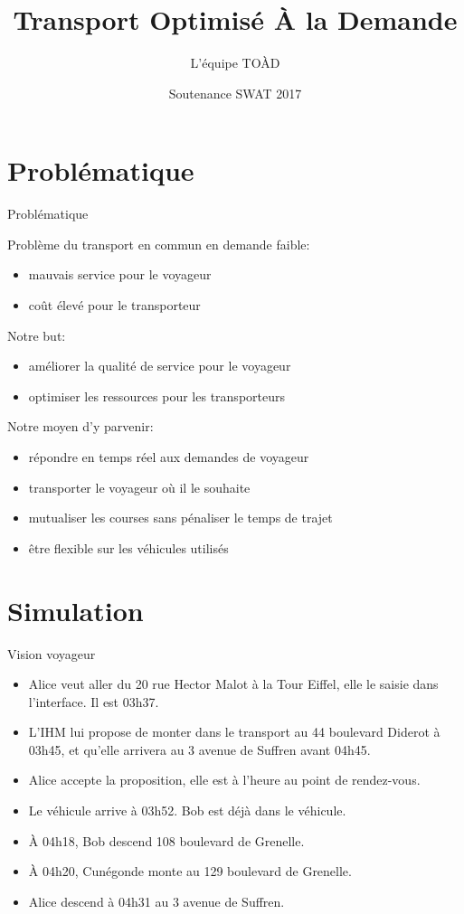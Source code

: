 \documentclass[table]{beamer}
\title{Transport Optimisé À la Demande}
\author{L'équipe TOÀD}
\institute[Kisio Digital] %
{
  Kisio Digital\\
  20 rue Hector Malot\\
  75012 Paris, France}
\date{Soutenance SWAT 2017}
\begin{document}
\begin{frame}
  \titlepage
\end{frame}

\section{Problématique}

\begin{frame}{Problématique}

  Problème du transport en commun en demande faible:
  \begin{itemize}
  \item mauvais service pour le voyageur
  \item coût élevé pour le transporteur
  \end{itemize}

  Notre but:
  \begin{itemize}
  \item améliorer la qualité de service pour le voyageur
  \item optimiser les ressources pour les transporteurs
  \end{itemize}

  Notre moyen d'y parvenir:
  \begin{itemize}
  \item répondre en temps réel aux demandes de voyageur
  \item transporter le voyageur où il le souhaite
  \item mutualiser les courses sans pénaliser le temps de trajet
  \item être flexible sur les véhicules utilisés
  \end{itemize}
\end{frame}

\section{Simulation}

\begin{frame}{Vision voyageur}

  \begin{itemize}[<+->]
  \item Alice veut aller du 20 rue Hector Malot à la Tour Eiffel, elle
    le saisie dans l'interface. Il est 03h37.
  \item L'IHM lui propose de monter dans le transport au 44 boulevard
    Diderot à 03h45, et qu'elle arrivera au 3 avenue de Suffren avant
    04h45.
  \item Alice accepte la proposition, elle est à l'heure au point de
    rendez-vous.
  \item Le véhicule arrive à 03h52. Bob est déjà dans le véhicule.
  \item À 04h18, Bob descend 108 boulevard de Grenelle.
  \item À 04h20, Cunégonde monte au 129 boulevard de Grenelle.
  \item Alice descend à 04h31 au 3 avenue de Suffren.
  \end{itemize}
\end{frame}
\end{document}
